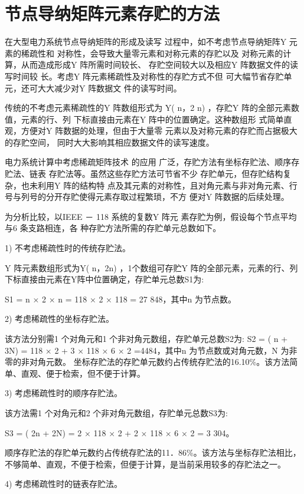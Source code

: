 \documentclass{ctexart} %
\begin{document}
\section{节点导纳矩阵元素存贮的方法}

在大型电力系统节点导纳矩阵的形成及读写
过程中，如不考虑节点导纳矩阵Y 元素的稀疏性和
对称性，会导致大量零元素和对称元素的存贮以及
对称元素的计算，从而造成形成Y 阵所需时间较长、
存贮空间较大以及相应Y 阵数据文件的读写时间较
长。考虑Y 阵元素稀疏性及对称性的存贮方式不但
可大幅节省存贮单元，还可大大减少对Y 阵数据文
件的读写时间。

传统的不考虑元素稀疏性的Y 阵数组形式为
Y( n，2 n) ，存贮Y 阵的全部元素数值，元素的行、列
下标直接由元素在Y 阵中的位置确定。这种数组形
式简单直观，方便对Y 阵数据的处理，但由于大量零
元素以及对称元素的存贮而占据极大的存贮空间，
同时大大影响其相应数据文件的读写速度。

电力系统计算中考虑稀疏矩阵技术 的应用
广泛，存贮方法有坐标存贮法、顺序存贮法、链表
存贮法等。虽然这些存贮方法可节省不少
存贮单元，但存贮结构复杂，也未利用Y 阵的结构特
点及其元素的对称性，且对角元素与非对角元素、行
号与列号的分开存贮使得元素存取过程繁琐，不方
便对Y 阵数据的后续处理。

为分析比较，以IEEE － 118 系统的复数Y 阵元
素存贮为例，假设每个节点平均与6 条支路相连，各
种存贮方法所需的存贮单元总数如下。

1) 不考虑稀疏性时的传统存贮法。

Y 阵元素数组形式为Y( n，2n) ，1个数组可存贮Y 阵的全部元素，元素的行、列下标直接由元素在Y阵中位置确定，存贮单元总数S1为:

S1 = n × 2 × n = 118 × 2 × 118 = 27 848，其中n 为节点数。

2) 考虑稀疏性的坐标存贮法。

该方法分别需1 个对角元和1 个非对角元数组，存贮单元总数S2为:
S2 = ( n + 3N) = 118 × 2 + 3 × 118 × 6 × 2 =4484，其中n 为节点数或对角元数，N 为非零的非对角元数。
坐标存贮法的存贮单元数约占传统存贮法的16.10\%。该方法简单、直观、便于检索，但不便于计算。

3) 考虑稀疏性时的顺序存贮法。

该方法需1 个对角元和2 个非对角元数组，存贮单元总数S3为:

S3 = ( 2n + 2N) = 2 × 118 × 2 + 2 × 118 × 6 × 2 = 3 304。

顺序存贮法的存贮单元数约占传统存贮法的11．86\%。该方法与坐标存贮法相比，不够简单、直观，不便于检索，但便于计算，是当前采用较多的存贮法之一。

4) 考虑稀疏性时的链表存贮法。
\end{document}
